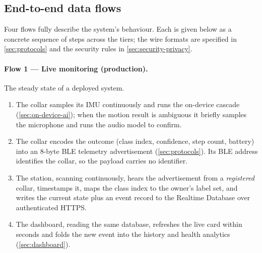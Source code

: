 \subsection{End-to-end data flows}

Four flows fully describe the system's behaviour. Each is given below as a concrete sequence of steps
across the tiers; the wire formats are specified in \cref{sec:protocols} and the security rules in
\cref{sec:security-privacy}.

\paragraph{Flow 1 --- Live monitoring (production).}
The steady state of a deployed system.
\begin{enumerate}[leftmargin=1.6em,itemsep=2pt]
  \item The collar samples its IMU continuously and runs the on-device cascade
        (\cref{sec:on-device-ai}); when the motion result is ambiguous it briefly samples the
        microphone and runs the audio model to confirm.
  \item The collar encodes the outcome (class index, confidence, step count, battery) into an 8-byte
        BLE telemetry advertisement (\cref{sec:protocols}). Its BLE address identifies the collar, so
        the payload carries no identifier.
  \item The station, scanning continuously, hears the advertisement from a \emph{registered} collar,
        timestamps it, maps the class index to the owner's label set, and writes the current state
        plus an event record to the Realtime Database over authenticated HTTPS.
  \item The dashboard, reading the same database, refreshes the live card within seconds and folds
        the new event into the history and health analytics (\cref{sec:dashboard}).
\end{enumerate}

